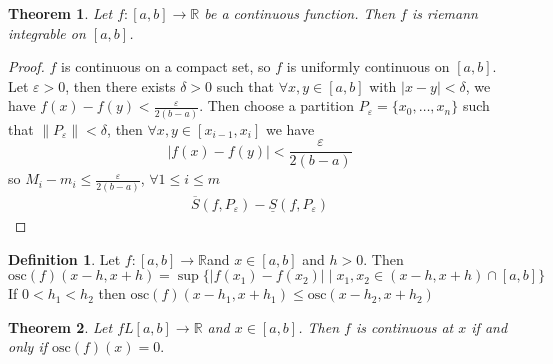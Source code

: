 \documentclass[12pt]{article}
\newtheorem{theorem}{Theorem}[section]
\theoremstyle{definition}
\newtheorem{definition}{Definition}[section]
\theoremstyle{definition}
\newcommand{\abs}[1]{\lvert #1 \rvert}
\begin{document}
        \begin{theorem}
            Let $f:[a, b]\to\mathbb{R}$ be a continuous function. Then $f$ is
            riemann integrable on $[a, b]$.
        \end{theorem}
            \begin{proof}
                $f$ is continuous on a compact set, so $f$ is uniformly
                continuous on $[a, b]$. Let $\varepsilon>0$, then there exists
                $\delta>0$ such that $\forall x, y\in[a, b]$ with
                $\abs{x-y}<\delta$, we have
                $f(x)-f(y)<\frac{\varepsilon}{2(b-a)}$. Then choose a partition
                $P_{\varepsilon}=\{x_0,\dots, x_n\} $ such that
                $\|P_{\varepsilon}\|<\delta$, then $\forall x, y\in[x_{i-1},
                x_i]$ we have
                    \begin{equation*}
                        \abs{f(x)-f(y)}<\frac{\varepsilon}{2(b-a)}
                    \end{equation*}
                so $M_i-m_i\leq\frac{\varepsilon}{2(b-a)}$, $\forall 1\leq
                i\leq m$
                    \begin{equation*}
                        \begin{split}
                            \overline{S}(f, P_{\varepsilon})-\underline{S}(f,
                            P_{\varepsilon})
                        \end{split}
                    \end{equation*}
            \end{proof}
        \begin{definition}
            Let $f:[a, b]\to\mathbb{R}$and $x\in[a, b]$ and $h>0$. Then 
                \begin{equation*}
                    \text{osc}(f)(x-h, x+h) = \sup \{\abs{f(x_1)-f(x_2)}\mid
                    x_1, x_2\in(x-h, x+h)\cap[a, b]\} 
                \end{equation*}
                If $0<h_1<h_2$ then $\text{osc}(f)(x-h_1,
                x+h_1)\leq\text{osc}(x-h_2, x+h_2)$
        \end{definition}
        \begin{theorem}
            Let $fL[a, b]\to\mathbb{R}$ and $x\in[a, b]$. Then $f$ is
            continuous at $x$ if and only if $\text{osc}(f)(x)=0.$
        \end{theorem}
\end{document}
